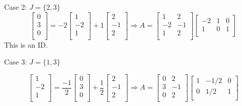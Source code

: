 Case 2: $J=\{2,3\}$
\begin{equation*}
    \begin{bmatrix}
        0\\
        3\\
        0\\
    \end{bmatrix}
    =
    -2
    \begin{bmatrix}
        1\\
        -2\\
        1\\
    \end{bmatrix}
    +1
    \begin{bmatrix}
        2\\
        -1\\
        2\\
    \end{bmatrix}
    \Rightarrow
    A =
    \begin{bmatrix}
        1&2\\
        -2&-1\\
        1&2\\
    \end{bmatrix}
    \begin{bmatrix}
        -2&1&0\\
        1&0&1\\
    \end{bmatrix}
\end{equation*}
This is an ID.

Case 3: $J=\{1,3\}$

\begin{equation*}
    \begin{bmatrix}
        1\\
        -2\\
        1\\
    \end{bmatrix}
    =
    \frac{-1}{2}
    \begin{bmatrix}
        0\\
        3\\
        0\\
    \end{bmatrix}
    +
    \frac{1}{2}
    \begin{bmatrix}
        2\\
        -1\\
        2\\
    \end{bmatrix}
    \Rightarrow
    A =
    \begin{bmatrix}
        0&2\\
        3&-1\\
        0&2\\
    \end{bmatrix}
    \begin{bmatrix}
        1&-1/2&0\\
        0&1/2&1\\
    \end{bmatrix}
\end{equation*}

